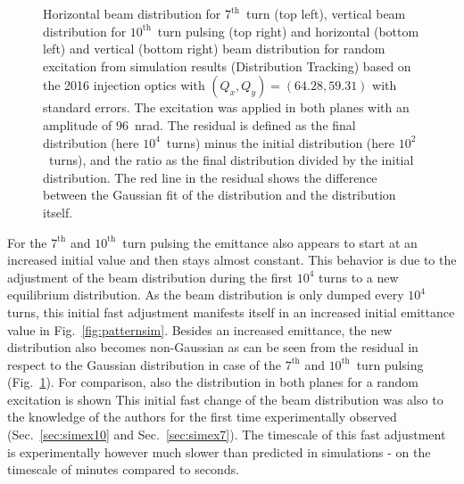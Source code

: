 \documentclass[%
 reprint,
 amsmath,amssymb,
 aps,
prstab,
]{revtex4-1}
\begin{document}
\begin{figure}[t]
\begin{minipage}[t]{0.49\linewidth}
	\end{minipage}	
	\caption{\label{fig:patternhist} Horizontal beam distribution for $7^{\mathrm{th}}$~turn (top left), vertical beam distribution for $10^{\mathrm{th}}$~turn pulsing (top right) and horizontal (bottom left) and vertical (bottom right) beam distribution for random excitation from simulation results (Distribution Tracking) based on the 2016 injection optics with $(Q_x,Q_y)=(64.28,59.31)$ with standard errors. The excitation was applied in both planes with an amplitude of 96~nrad. The residual is defined as the final distribution (here $10^4$~turns) minus the initial distribution (here $10^2$~turns), and the ratio as the final distribution divided by the initial distribution. The red line in the residual shows the difference between the Gaussian fit of the distribution and the distribution itself.}
\end{figure}
For the $7^{\mathrm{th}}$ and $10^{\mathrm{th}}$~turn pulsing the emittance also appears to start at an increased initial value and then stays almost constant. This behavior is due to the adjustment of the beam distribution during the first $10^4$ turns to a new equilibrium distribution. As the beam distribution is only dumped every $10^4$ turns, this initial fast adjustment manifests itself in an increased initial emittance value in Fig.~\ref{fig:patternsim}. Besides an increased emittance, the new distribution also becomes non-Gaussian as can be seen from the residual in respect to the Gaussian distribution in case of the $7^{\mathrm{th}}$ and $10^{\mathrm{th}}$~turn pulsing (Fig.~\ref{fig:patternhist}). For comparison, also the distribution in both planes for a random excitation is shown This initial fast change of the beam distribution was also to the knowledge of the authors for the first time experimentally observed (Sec.~\ref{sec:simex10} and Sec.~\ref{sec:simex7}). The timescale of this fast adjustment is experimentally however much slower than predicted in simulations - on the timescale of minutes compared to seconds. 
\end{document}
